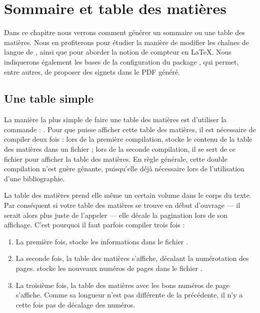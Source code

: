 \chapter{Sommaire et table des matières}\label{toc}

\begin{intro}
Dans ce chapitre nous verrons comment générer un sommaire ou une table des matières. Nous en profiterons pour étudier la manière de modifier les chaînes de langue de , ainsi que pour aborder la notion de compteur en \LaTeX{}. Nous indiquerons également les bases de la configuration du package , qui permet, entre autres, de proposer des signets dans le PDF généré.
\end{intro}

\section{Une table simple}

La manière la plus simple de faire une table des matières est d'utiliser la commande : .
Pour que \XeLaTeX{} puisse afficher cette table des matières, il est nécessaire de compiler deux fois : lors de la première compilation, \XeLaTeX{} stocke le contenu de la table des matières dans un fichier  ; lors de la seconde compilation, il se sert de ce fichier pour afficher la table des matières. En règle générale, cette double compilation n'est guère gênante, puisqu'elle déjà nécessaire lors de l'utilisation d'une bibliographie.

\begin{attention}
La table des matières prend elle même un certain volume dans le corps du texte. Par conséquent si votre table des matières se trouve en début d'ouvrage --- il serait alors plus juste de l'appeler  --- elle décale la pagination lors de son affichage. C'est pourquoi il faut parfois compiler trois fois :

\begin{enumerate}
\item La première fois, \XeLaTeX{} stocke les informations dans le fichier .
\item La seconde fois, la table des matières  s'affiche, décalant la numérotation des pages. \XeLaTeX{}  stocke les nouveaux numéros de pages  dans le fichier .
\item La troisième fois, la table des matières avec les bons numéros de page   s'affiche. Comme sa longueur n'est pas différente de la précédente, il n'y a cette fois pas de décalage des numéros.
\end{enumerate}

\end{attention}

